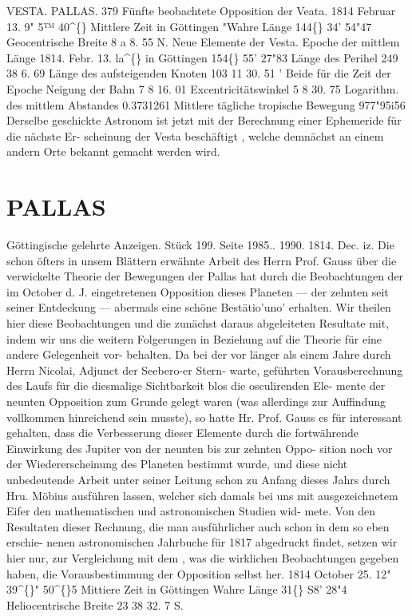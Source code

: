 \documentclass[12pt,a4paper]{article}
\newcommand{\degree}{\textdegree}
\begin{document}
\newpage
VESTA.      PALLAS.  379 
Fünfte  beobachtete   Opposition  der    Veata. 
1814  Februar  13.     9"  5™  40\textasciicircum\{\}  Mittlere  Zeit  in  Göttingen 
"Wahre  Länge   
144\degree\{\}  34'   54"47 
Geocentrische  Breite          8      a      8. 55  N. 
Neue  Elemente  der  Vesta. 
Epoche  der  mittlem  Länge  1814.  Febr.  13.  la\textasciicircum\{\}  in  Göttingen  154\degree\{\}  55'    27"83 
Länge  des  Perihel    249    38      6. 69 
Länge  des  aufsteigenden  Knoten    103     11     30. 51 
'  Beide  für  die  Zeit  der  Epoche 
Neigung  der  Bahn    7      8     16. 01 
Excentricitätswinkel    5      8     30. 75 
Logarithm.  des  mittlem  Abstandes    0.3731261 
Mittlere  tägliche  tropische  Bewegung    977"95i56 
Derselbe  geschickte  Astronom  ist  jetzt  mit  der  Berechnung  einer  Ephemeride  für  die  nächste  Er- 
scheinung der  Vesta  beschäftigt ,  welche  demnächst  an  einem  andern  Orte  bekannt  gemacht  werden  wird. 

\section*{PALLAS}
Göttingische  gelehrte  Anzeigen.     Stück  199.  Seite  1985..  1990.     1814.  Dec.  iz. 
Die  schon  öfters  in  unsem  Blättern  erwähnte  Arbeit  des  Herrn  Prof.  Gauss  über  die  verwickelte 
Theorie  der  Bewegungen  der  Pallas  hat  durch  die  Beobachtungen  der  im  October  d.  J.  eingetretenen 
Opposition  dieses  Planeten  ---  der  zehnten  seit  seiner  Entdeckung  ---  abermals  eine  schöne  Bestätio'uno' 
erhalten.  Wir  theilen  hier  diese  Beobachtungen  und  die  zunächst  daraus  abgeleiteten  Resultate  mit, 
indem  wir  uns  die  weitern  Folgerungen  in  Beziehung  auf  die  Theorie  für  eine  andere  Gelegenheit  vor- 
behalten. Da  bei  der  vor  länger  als  einem  Jahre  durch  Herrn  Nicolai,  Adjunct  der  Seebero-er  Stern- 
warte, geführten  Vorausberechnung  des  Laufs  für  die  diesmalige  Sichtbarkeit  blos  die  osculirenden  Ele- 
mente der  neunten  Opposition  zum  Grunde  gelegt  waren  (was  allerdings  zur  Auffindung  vollkommen 
hinreichend  sein  musste),  so  hatte  Hr.  Prof.  Gauss  es  für  interessant  gehalten,  dass  die  Verbesserung 
dieser  Elemente  durch  die  fortwährende  Einwirkung  des  Jupiter  von  der  neunten  bis  zur  zehnten  Oppo- 
sition noch  vor  der  Wiedererscheinung  des  Planeten  bestimmt  wurde,  und  diese  nicht  unbedeutende 
Arbeit  unter  seiner  Leitung  schon  zu  Anfang  dieses  Jahrs  durch  Hru.  Möbius  ausführen  lassen,  welcher 
sich  damals  bei  uns  mit  ausgezeichnetem  Eifer  den  mathematischen  und  astronomischen  Studien  wid- 
mete. Von  den  Resultaten  dieser  Rechnung,  die  man  ausführlicher  auch  schon  in  dem  so  eben  erschie- 
nenen astronomischen  Jahrbuche  für  1817  abgedruckt  findet,  setzen  wir  hier  nur,  zur  Vergleichung  mit 
dem  ,  was  die  wirklichen  Beobachtungen  gegeben  haben,  die  Vorausbestimmung  der  Opposition  selbst  her. 
1814  October  25.  12"  39\textasciicircum\{\}"  50\textasciicircum\{\}5  Mittiere  Zeit  in  Göttingen 
Wahre  Länge   
31\degree\{\}  S8'    28"4 
Heliocentrische  Breite   
23     38     32. 7  S. 
\end{document}
